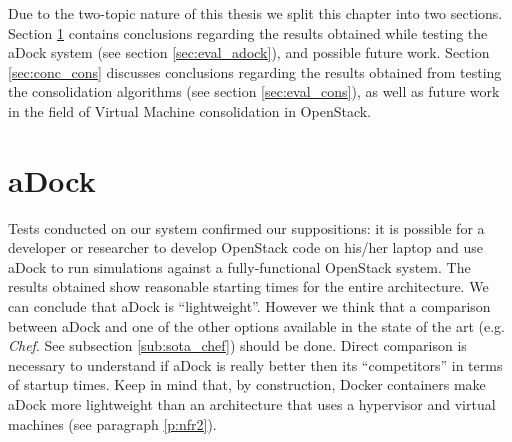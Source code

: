 
Due to the two-topic nature of this thesis we split this chapter into two sections. Section \ref{sec:conc_adock} contains conclusions regarding the results obtained while testing the aDock system (see section \ref{sec:eval_adock}), and possible future work. Section \ref{sec:conc_cons} discusses conclusions regarding the results obtained from testing the consolidation algorithms (see section \ref{sec:eval_cons}), as well as future work in the field of Virtual Machine consolidation in OpenStack.

\section{aDock}
\label{sec:conc_adock}
Tests conducted on our system confirmed our suppositions: it is possible for a developer or researcher to develop OpenStack code on his/her laptop and use aDock to run simulations against a fully-functional OpenStack system. The results obtained show reasonable starting times for the entire architecture. We can conclude that aDock is ``lightweight''. However we think that a comparison between aDock and one of the other options available in the state of the art (e.g. \textit{Chef}. See subsection \ref{sub:sota_chef}) should be done. Direct comparison is necessary to understand if aDock is really better then its ``competitors'' in terms of startup times. Keep in mind that, by construction, Docker containers make aDock more lightweight than an architecture that uses a hypervisor and virtual machines (see paragraph \ref{p:nfr2}).

